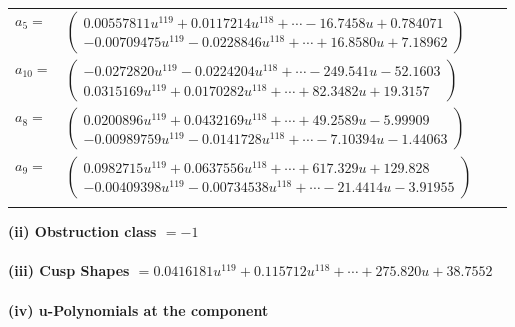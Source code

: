 \documentclass[1p]{elsarticle_modified}
\theoremstyle{definition}
\begin{document}
\begin{tabular}{m{7pt} m{180pt} m{7pt} m{180pt} }
\flushright $a_{5}=$&$\begin{pmatrix}0.00557811 u^{119}+0.0117214 u^{118}+\cdots-16.7458 u+0.784071\\-0.00709475 u^{119}-0.0228846 u^{118}+\cdots+16.8580 u+7.18962\end{pmatrix}$ \\
\flushright $a_{10}=$&$\begin{pmatrix}-0.0272820 u^{119}-0.0224204 u^{118}+\cdots-249.541 u-52.1603\\0.0315169 u^{119}+0.0170282 u^{118}+\cdots+82.3482 u+19.3157\end{pmatrix}$ \\
\flushright $a_{8}=$&$\begin{pmatrix}0.0200896 u^{119}+0.0432169 u^{118}+\cdots+49.2589 u-5.99909\\-0.00989759 u^{119}-0.0141728 u^{118}+\cdots-7.10394 u-1.44063\end{pmatrix}$ \\
\flushright $a_{9}=$&$\begin{pmatrix}0.0982715 u^{119}+0.0637556 u^{118}+\cdots+617.329 u+129.828\\-0.00409398 u^{119}-0.00734538 u^{118}+\cdots-21.4414 u-3.91955\end{pmatrix}$\\&\end{tabular}
\flushleft \textbf{(ii) Obstruction class $= -1$}\\~\\
\flushleft \textbf{(iii) Cusp Shapes $= 0.0416181 u^{119}+0.115712 u^{118}+\cdots+275.820 u+38.7552$}\\~\\
\newpage\renewcommand{\arraystretch}{1}
\flushleft \textbf{(iv) u-Polynomials at the component}\newline \\
\end{document}
